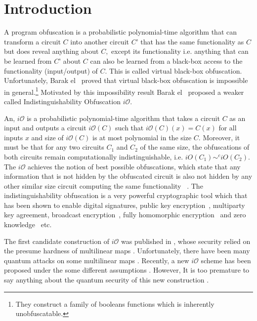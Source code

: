 \section{Introduction}
A program obfuscation is a probabilistic polynomial-time algorithm that can transform a circuit $C$ into another circuit $C’$ that has the same functionality as $C$ but does reveal anything about $C,$ except its functionality i.e. anything that can be learned from $C’$ about $C$ can also be learned from a black-box access to the functionality (input/output) of $C.$ This is called virtual black-box obfuscation. Unfortunately, Barak el~\cite{BGI+12}  proved that virtual black-box obfuscation is impossible in general.\footnote{They construct a family of booleans functions which is inherently unobfuscatable.} Motivated by this impossibility result Barak el~\cite{BGI+12} proposed a weaker called Indistinguishability Obfuscation $i\mathcal{O}.$ 

An, $i\mathcal{O}$ is a probabilistic polynomial-time algorithm that takes a circuit $C$ as an input and outputs a circuit $i\mathcal{O}(C)$ such that $i\mathcal{O}(C)(x)=C(x)$ for all inputs $x$ and size of $i\mathcal{O}(C)$ is at most polynomial in the size $C.$ Moreover, it must be that for any two circuits $C_1$ and $C_2$ of the same size, the obfuscations of both circuits remain computationally indistinguishable, i.e. $iO(C_1)\sim^c iO(C_2).$ The $i\mathcal{O}$ achieves the notion of best possible obfuscations, which state that any information that is not hidden by the obfuscated circuit is also not hidden by any other similar size circuit computing the same functionality ~\cite{GR14}. The indistinguishability obfuscation is a very powerful cryptographic tool which that has been shown to enable digital signatures, public key encryption~\cite{SW14}, multiparty key agreement, broadcast encryption~\cite{BZ14}, fully homomorphic encryption~\cite{CLTV15} and zero knowledge~\cite{BP15} etc. 

The first candidate construction of $i\mathcal{O}$ was published in \cite{GGH+13}, whose security relied on the presume hardness of multilinear maps \cite{CLT13, LSS14, GGH15}. Unfortunately, there have been many quantum attacks on some multilinear maps \cite{ABD16, CDPR16, CGH17}.  Recently, a new $i\mathcal{O}$ scheme has been proposed under the some different assumptions \cite{AJL+19}. However, It is too premature to say anything about the quantum security of this new construction \cite{AJL+19}. 

